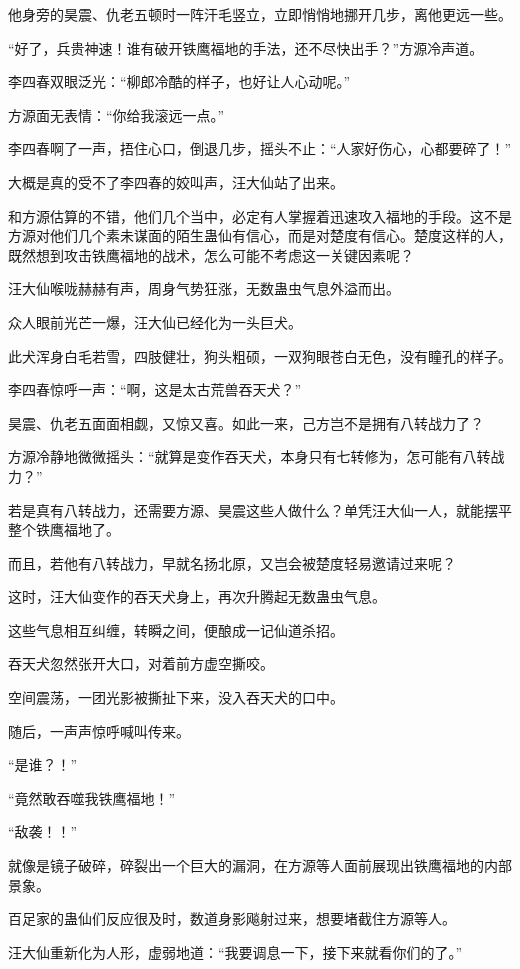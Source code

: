 \begin{this_body}
他身旁的昊震、仇老五顿时一阵汗毛竖立，立即悄悄地挪开几步，离他更远一些。

“好了，兵贵神速！谁有破开铁鹰福地的手法，还不尽快出手？”方源冷声道。

李四春双眼泛光：“柳郎冷酷的样子，也好让人心动呢。”

方源面无表情：“你给我滚远一点。”

李四春啊了一声，捂住心口，倒退几步，摇头不止：“人家好伤心，心都要碎了！”

大概是真的受不了李四春的姣叫声，汪大仙站了出来。

和方源估算的不错，他们几个当中，必定有人掌握着迅速攻入福地的手段。这不是方源对他们几个素未谋面的陌生蛊仙有信心，而是对楚度有信心。楚度这样的人，既然想到攻击铁鹰福地的战术，怎么可能不考虑这一关键因素呢？

汪大仙喉咙赫赫有声，周身气势狂涨，无数蛊虫气息外溢而出。

众人眼前光芒一爆，汪大仙已经化为一头巨犬。

此犬浑身白毛若雪，四肢健壮，狗头粗硕，一双狗眼苍白无色，没有瞳孔的样子。

李四春惊呼一声：“啊，这是太古荒兽吞天犬？”

昊震、仇老五面面相觑，又惊又喜。如此一来，己方岂不是拥有八转战力了？

方源冷静地微微摇头：“就算是变作吞天犬，本身只有七转修为，怎可能有八转战力？”

若是真有八转战力，还需要方源、昊震这些人做什么？单凭汪大仙一人，就能摆平整个铁鹰福地了。

而且，若他有八转战力，早就名扬北原，又岂会被楚度轻易邀请过来呢？

这时，汪大仙变作的吞天犬身上，再次升腾起无数蛊虫气息。

这些气息相互纠缠，转瞬之间，便酿成一记仙道杀招。

吞天犬忽然张开大口，对着前方虚空撕咬。

空间震荡，一团光影被撕扯下来，没入吞天犬的口中。

随后，一声声惊呼喊叫传来。

“是谁？！”

“竟然敢吞噬我铁鹰福地！”

“敌袭！！”

就像是镜子破碎，碎裂出一个巨大的漏洞，在方源等人面前展现出铁鹰福地的内部景象。

百足家的蛊仙们反应很及时，数道身影飚射过来，想要堵截住方源等人。

汪大仙重新化为人形，虚弱地道：“我要调息一下，接下来就看你们的了。”


\end{this_body}
